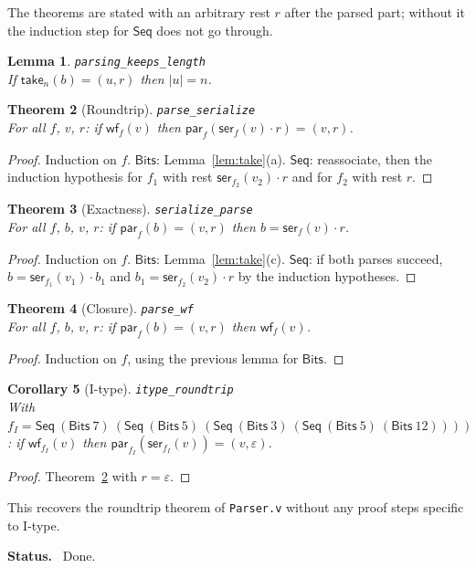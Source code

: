 \documentclass[11pt,a4paper]{article}
\theoremstyle{plain}
\newtheorem{theorem}{Theorem}[section]
\newtheorem{lemma}[theorem]{Lemma}
\newtheorem{corollary}[theorem]{Corollary}
\theoremstyle{definition}
\theoremstyle{remark}
\newcommand{\take}{\mathsf{take}}
\newcommand{\ser}{\mathsf{ser}}
\newcommand{\parse}{\mathsf{par}}
\newcommand{\wf}{\mathsf{wf}}
\newcommand{\Bits}{\mathsf{Bits}}
\newcommand{\Seq}{\mathsf{Seq}}
\newcommand{\code}[1]{\texttt{#1}}
\newenvironment{status}{\par\medskip\noindent\textbf{Status.}\ }{\par}
\begin{document}
The theorems are stated with an arbitrary rest $r$ after the parsed part; without it the induction step for $\Seq$ does not go through.

\begin{lemma}\hfill\code{parsing\_keeps\_length}\\
If $\take_n(b)=(u,r)$ then $|u|=n$.
\end{lemma}

\begin{theorem}[Roundtrip]\label{thm:R} \hfill\code{parse\_serialize}\\
For all $f$, $v$, $r$: if $\wf_f(v)$ then $\parse_f(\ser_f(v)\cdot r)=(v,r)$.
\end{theorem}
\begin{proof}
Induction on $f$. $\Bits$: Lemma~\ref{lem:take}(a). $\Seq$: reassociate, then the induction hypothesis for $f_1$ with rest $\ser_{f_2}(v_2)\cdot r$ and for $f_2$ with rest $r$.
\end{proof}

\begin{theorem}[Exactness] \hfill\code{serialize\_parse}\\
For all $f$, $b$, $v$, $r$: if $\parse_f(b)=(v,r)$ then $b=\ser_f(v)\cdot r$.
\end{theorem}
\begin{proof}
Induction on $f$. $\Bits$: Lemma~\ref{lem:take}(c). $\Seq$: if both parses succeed, $b=\ser_{f_1}(v_1)\cdot b_1$ and $b_1=\ser_{f_2}(v_2)\cdot r$ by the induction hypotheses.
\end{proof}

\begin{theorem}[Closure] \hfill\code{parse\_wf}\\
For all $f$, $b$, $v$, $r$: if $\parse_f(b)=(v,r)$ then $\wf_f(v)$.
\end{theorem}
\begin{proof}
Induction on $f$, using the previous lemma for $\Bits$.
\end{proof}

\begin{corollary}[I-type] \hfill\code{itype\_roundtrip}\\
With $f_I = \Seq\ (\Bits\ 7)\ (\Seq\ (\Bits\ 5)\ (\Seq\ (\Bits\ 3)\ (\Seq\ (\Bits\ 5)\ (\Bits\ 12))))$: if $\wf_{f_I}(v)$ then $\parse_{f_I}(\ser_{f_I}(v))=(v,\varepsilon)$.
\end{corollary}
\begin{proof}
Theorem~\ref{thm:R} with $r=\varepsilon$.
\end{proof}

This recovers the roundtrip theorem of \code{Parser.v} without any proof steps specific to I-type.

\begin{status}
Done.
\end{status}
\end{document}
